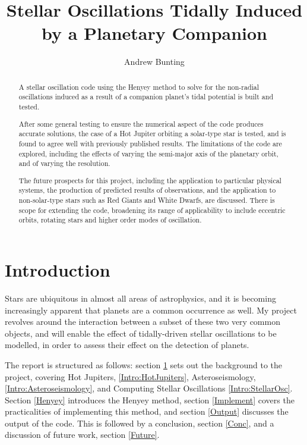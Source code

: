 \documentclass[11pt]{amsart}
\title{Stellar Oscillations Tidally Induced by a Planetary Companion}
\author{Andrew Bunting}
\begin{document}
\maketitle


\begin{abstract}

A stellar oscillation code using the Henyey method to solve for the non-radial oscillations induced as a result of a companion planet's tidal potential is built and tested.

After some general testing to ensure the numerical aspect of the code produces accurate solutions, the case of a Hot Jupiter orbiting a solar-type star is tested, and is found to agree well with previously published results.  The limitations of the code are explored, including the effects of varying the semi-major axis of the planetary orbit, and of varying the resolution.

The future prospects for this project, including the application to particular physical systems, the production of predicted results of observations, and the application to non-solar-type stars such as Red Giants and White Dwarfs, are discussed.  There is scope for extending the code, broadening its range of applicability to include eccentric orbits, rotating stars and higher order modes of oscillation.

\end{abstract}


\section{Introduction} \label{Introduction}

Stars are ubiquitous in almost all areas of astrophysics, and it is becoming increasingly apparent that planets are a common occurrence as well.  My project revolves around the interaction between a subset of these two very common objects, and will enable the effect of tidally-driven stellar oscillations to be modelled, in order to assess their effect on the detection of planets.

The report is structured as follows: section \ref{Introduction} sets out the background to the project, covering Hot Jupiters, \ref{Intro:HotJupiters}, Asteroseismology, \ref{Intro:Asteroseismology}, and Computing Stellar Oscillations \ref{Intro:StellarOsc}.  Section \ref{Henyey} introduces the Henyey method, section \ref{Implement} covers the practicalities of implementing this method, and section \ref{Output} discusses the output of the code.  This is followed by a conclusion, section \ref{Conc}, and a discussion of future work, section \ref{Future}.
\end{document}
